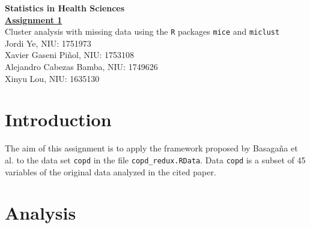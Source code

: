 \documentclass[10pt,a4paper,twoside]{article}\usepackage[]{graphicx}\usepackage[]{xcolor}
\begin{document}
\begin{titlepage}
  \begin{center}
    \vspace*{4cm}
    \textbf{\Huge Statistics in Health Sciences}
    \vspace{4em}\\
    \textbf{\huge \underline{Assignment 1}} \\[1em]
    \large{Cluster analysis with missing data using the \texttt{R} packages \texttt{mice} and \texttt{miclust}}\\
    [1em]
    Jordi Ye, NIU: 1751973\\
    Xavier Gaseni Piñol, NIU: 1753108\\
    Alejandro Cabezas Bamba, NIU: 1749626\\
    Xinyu Lou, NIU: 1635130
    \vfill
  \end{center}
\end{titlepage}

\tableofcontents

\newpage

\section{Introduction}

The aim of this assignment is to apply the framework proposed by Basagaña et al. to the data set \texttt{copd} in the file \texttt{copd\_redux.RData}. Data \texttt{copd} is a subset of 45 variables of the original data analyzed in the cited paper\citep{basagana2013}.

\section{Analysis}
\end{document}
